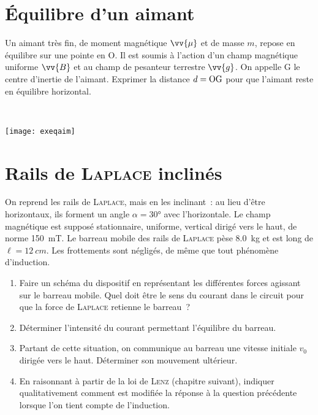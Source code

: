 \documentclass[a4paper, 10pt, final, garamond]{book}
\begin{document}
\section{Équilibre d'un aimant}
\label{sec:exeqaim}
\noindent
\begin{minipage}[t]{.7\linewidth}
  Un aimant très fin, de moment magnétique $\vv{\mu}$ et de masse $m$, repose en
  équilibre sur une pointe en O. Il est soumis à l'action d'un champ magnétique
  uniforme $\vv{B}$ et au champ de pesanteur terrestre $\vv{g}$. On appelle G le
  centre d'inertie de l'aimant.
  \smallbreak
  Exprimer la distance $d = \rm OG$ pour que l'aimant reste en équilibre
  horizontal.
\end{minipage}
\hfill
\begin{minipage}[t]{.3\linewidth}
  ~
  \vspace*{-20pt}
  \begin{center}
    \texttt{[image: exeqaim]}
    \label{fig:exeqaim}
  \end{center}
\end{minipage}

\section{Rails de \textsc{Laplace} inclinés}
\label{sec:railpl}
On reprend les rails de \textsc{Laplace}, mais en les inclinant~: au lieu d'être
horizontaux, ils forment un angle $\alpha = \ang{30;;}$ avec l'horizontale. Le
champ magnétique est supposé stationnaire, uniforme, vertical dirigé vers le
haut, de norme \SI{150}{mT}. Le barreau mobile des rails de \textsc{Laplace}
pèse \SI{8.0}{kg} et est long de $\ell = \SI{12}{cm}$. Les frottements sont
négligés, de même que tout phénomène d'induction.
\begin{enumerate}
  \item Faire un schéma du dispositif en représentant les différentes forces
    agissant sur le barreau mobile. Quel doit être le sens du courant dans le
    circuit pour que la force de \textsc{Laplace} retienne le barreau~?
  \item Déterminer l'intensité du courant permettant l'équilibre du barreau.
  \item Partant de cette situation, on communique au barreau une vitesse
    initiale $v_0$ dirigée vers le haut. Déterminer son mouvement ultérieur.
  \item En raisonnant à partir de la loi de \textsc{Lenz} (chapitre suivant),
    indiquer qualitativement comment est modifiée la réponse à la question
    précédente lorsque l'on tient compte de l'induction.
\end{enumerate}
\end{document}
